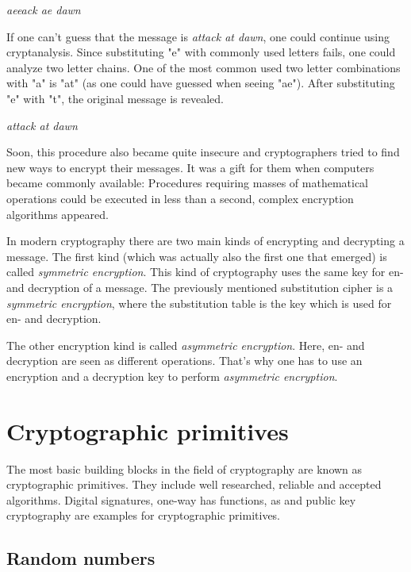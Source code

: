 \vspace{0.5cm}
\textit{aeeack ae dawn}
\vspace{0.5cm}

If one can't guess that the message is \textit{attack at dawn}, one could
continue using cryptanalysis. Since substituting "e" with commonly used letters
fails, one could analyze two letter chains. One of the most common used two
letter combinations with "a" is "at" (as one could have guessed when seeing
"ae").  After substituting "e" with "t", the original message is revealed.

\vspace{0.5cm}
\textit{attack at dawn}
\vspace{0.5cm}

Soon, this procedure also became quite insecure and cryptographers tried to
find new ways to encrypt their messages. It was a gift for them when computers
became commonly available: Procedures requiring masses of mathematical
operations could be executed in less than a second, complex encryption
algorithms appeared.

In modern cryptography there are two main kinds of encrypting and decrypting a
message. The first kind (which was actually also the first one that emerged) is
called \textit{symmetric encryption}. This kind of cryptography uses the same
key for en- and decryption of a message. The previously mentioned substitution
cipher is a \textit{symmetric encryption}, where the substitution table is the
key which is used for en- and decryption.

The other encryption kind is called \textit{asymmetric encryption}. Here, en-
and decryption are seen as different operations. That's why one has to use an
encryption and a decryption key to perform \textit{asymmetric encryption}.

\section{Cryptographic primitives}

The most basic building blocks in the field of cryptography are known as
cryptographic primitives. They include well researched, reliable and accepted
algorithms. Digital signatures, one-way has functions, as and public key
cryptography are examples for cryptographic primitives.

\subsection{Random numbers}

